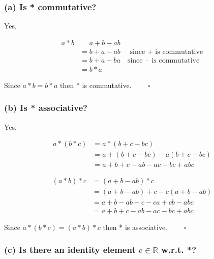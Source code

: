 \documentclass[
]{article}
\begin{document}
\hypertarget{a-is-commutative-1}{%
\subsubsection{(a) Is * commutative?}\label{a-is-commutative-1}}

Yes,

\begin{equation}
\label{3a}
\begin{split}
a*b &= a+b-ab\\
&= b+a-ab\quad\text{ since + is commutative}\\
&= b+a-ba\quad\text{since }\cdot\text{ is commutative}\\
&= b*a
\end{split}
\end{equation}

Since \(a*b=b*a\) then * is commutative. \(\quad\quad\square\)

\hypertarget{b-is-associative-1}{%
\subsubsection{(b) Is * associative?}\label{b-is-associative-1}}

Yes,

\begin{equation}
\label{3b}
\begin{split}
a*(b*c) &= a*(b+c-bc)\\
&= a+(b+c-bc)-a(b+c-bc)\\
&= a+b+c-ab-ac-bc+abc
\end{split}
\end{equation}

\begin{equation}
\label{3b2}
\begin{split}
(a*b)*c &= (a+b-ab)*c\\
&= (a+b-ab)+c-c(a+b-ab)\\
&= a+b-ab+c-ca+cb-abc\\
&= a+b+c-ab-ac-bc+abc
\end{split}
\end{equation}

Since \(a*(b*c)=(a*b)*c\) then * is associative. \(\quad\quad\square\)

\hypertarget{c-is-there-an-identity-element-ein-mathbbr-w.r.t.-1}{%
\subsubsection{\texorpdfstring{(c) Is there an identity element
\(e\in \mathbb{R}\) w.r.t.
*?}{(c) Is there an identity element e\textbackslash in \textbackslash mathbb\{R\} w.r.t. *?}}\label{c-is-there-an-identity-element-ein-mathbbr-w.r.t.-1}}
\end{document}
